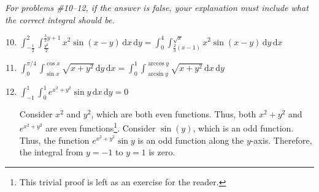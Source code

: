 \documentclass[11pt]{article}
\begin{document}
\textit{For problems \#10--12, if the answer is false, your explanation must include what the correct integral should be.}

\begin{enumerate}
  \setcounter{enumi}{9}
  
\item
  \(\int_{-\frac{1}{2}}^{2} \int_{\frac{y^2}{2}}^{\frac{3}{2}y+1} x^2 \sin(x-y)
  \,\mathrm{d}x\,\mathrm{d}y= \int_0^4 \int_{\frac{2}{3}(x-1)}^{\sqrt{x}} x^2
  \sin(x-y) \, \mathrm{d}y \, \mathrm{d}x\)

\item
  \(\int_0^{\pi/4} \int_{\sin x}^{\cos x} \sqrt{x + y^2} \, \mathrm{d}y\,
  \mathrm{d}x= \int_0^1 \int_{\arcsin y}^{\arccos y} \sqrt{x + y^2} \,
  \mathrm{d}x\, \mathrm{d}y\)

\item
  \(\int_{-1}^{1} \int_{0}^{1} e^{x^2 + y^2} \sin y \, \mathrm{d}x\,
  \mathrm{d}y= 0\)

  Consider \(x^2\) and \(y^2\), which are both even functions. Thus, both
  \(x^2 + y^2\) and \(e^{x^2 + y^2}\) are even
  functions\footnote{\label{fn:trivial} This trivial proof is left as an
    exercise for the reader.}. Consider \(\sin(y)\), which is an odd
  function\footnotemark[\value{footnote}]. Thus, the function
  \(e^{x^2 + y^2} \sin y\) is an odd function along the
  \(y\)-axis\footnotemark[\value{footnote}]. Therefore, the integral from
  \(y = -1\) to \(y = 1\) is zero.
\end{enumerate}
\end{document}
